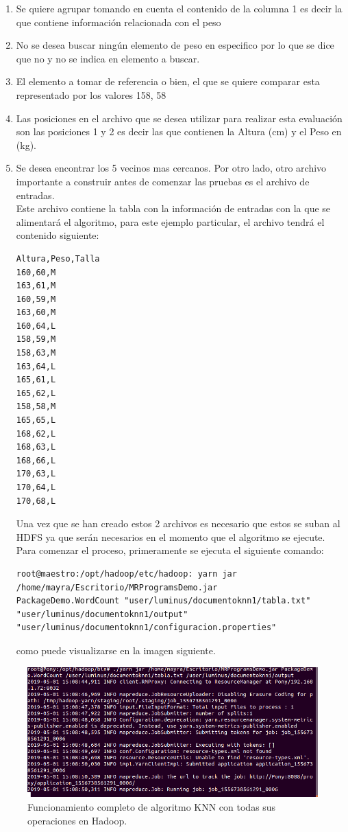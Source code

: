 \begin{enumerate}
 \item Se quiere agrupar tomando en cuenta el contenido de la columna 1 es decir la que contiene información relacionada con el peso
 \item No se desea buscar ningún elemento de peso en especifico por lo que se dice que no y no se indica en elemento a buscar.
 \item El elemento a tomar de referencia o bien, el que se quiere comparar esta representado por los valores 158, 58
 \item Las posiciones en el archivo que se desea utilizar para realizar esta evaluación son las posiciones 1 y 2 es decir las que contienen la Altura (cm) y el Peso en (kg).
 \item Se desea encontrar los 5 vecinos mas cercanos.
Por otro lado, otro archivo importante a construir antes de comenzar las pruebas es el archivo de entradas.
\\
Este archivo contiene la tabla con la información de entradas con la que se alimentará el algoritmo, para este ejemplo particular, el archivo tendrá el contenido siguiente: 
\begin{verbatim}
Altura,Peso,Talla
160,60,M
163,61,M
160,59,M
163,60,M
160,64,L
158,59,M
158,63,M
163,64,L
165,61,L
165,62,L
158,58,M
165,65,L
168,62,L
168,63,L
168,66,L
170,63,L 
170,64,L 
170,68,L 
\end{verbatim}
Una vez que se han creado estos 2 archivos es necesario que estos se suban al HDFS ya que serán necesarios en el momento que el algoritmo se ejecute.
\\
Para comenzar el proceso, primeramente se ejecuta el siguiente comando:
\begin{verbatim}
root@maestro:/opt/hadoop/etc/hadoop: yarn jar /home/mayra/Escritorio/MRProgramsDemo.jar 
PackageDemo.WordCount "user/luminus/documentoknn1/tabla.txt" "user/luminus/documentoknn1/output" 
"user/luminus/documentoknn1/configuracion.properties"
\end{verbatim} 
como puede visualizarse en la imagen siguiente.\\
\end{enumerate}
	\begin{figure}[H]
		\begin{center}
			\hypertarget{fig:funcio}{\hspace{1pt}}
			\includegraphics[width=.9\textwidth]{capitulo4a/images/im1.png}
			\caption{Funcionamiento completo de algoritmo KNN con todas sus operaciones en Hadoop.}
			\label{fig:funcio}
		\end{center}
	\end{figure}
